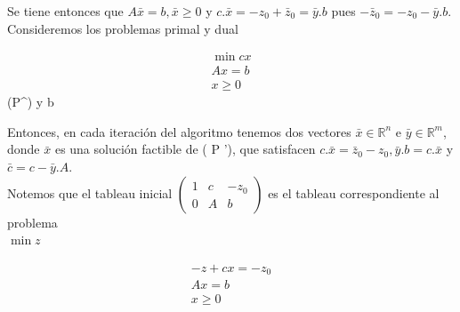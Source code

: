 \documentclass[10pt]{article}
\begin{document}
Se tiene entonces que $A \bar{x}=b, \bar{x} \geq 0$ y $c . \bar{x}=-z_{0}+\bar{z}_{0}=\bar{y} . b$ pues $-\bar{z}_{0}=-z_{0}-\bar{y} . b$.\\
Consideremos los problemas primal y dual


\begin{gather*}
\min c x \\
A x=b  \tag{$\prime$}\\
x \geq 0
\end{gather*} \quad\left(P^{\prime}\right) \quad \max y b


Entonces, en cada iteración del algoritmo tenemos dos vectores $\bar{x} \in \mathbb{R}^{n}$ e $\bar{y} \in \mathbb{R}^{m}$, donde $\bar{x}$ es una solución factible de ( P '), que satisfacen $c . \bar{x}=\bar{z}_{0}-z_{0}, \bar{y} . b=c . \bar{x}$ y $\bar{c}=c-\bar{y} . A$.\\
Notemos que el tableau inicial $\left(\begin{array}{cc|c}1 & c & -z_{0} \\ 0 & A & b\end{array}\right)$ es el tableau correspondiente al problema\\
$\min z$

$$
\begin{gathered}
-z+c x=-z_{0} \\
A x=b \\
x \geq 0
\end{gathered}
$$
\end{document}
